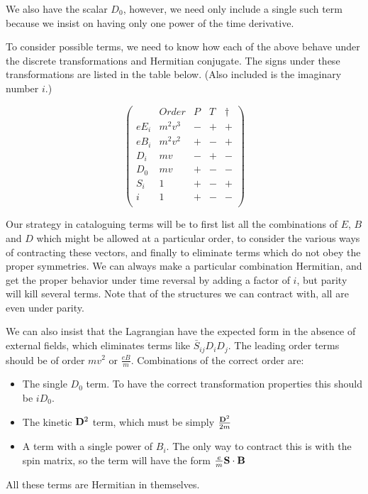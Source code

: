 We also have the scalar $D_0$, however, we need only include a single such term because we insist on having only one power of the time derivative.

To consider possible terms, we need to know how each of the above behave under the discrete transformations and Hermitian conjugate.  The signs under these transformations are listed in the table below.  (Also included is the imaginary number $i$.)

\[
\begin{pmatrix}
		& Order	&	P	&	T	&	\dagger	\\
eE_i	&m^2v^3	&	-	& 	+	&	+		\\
eB_i	&m^2v^2	&	+	&   -	&	+		\\
D_i		& mv	&	-	&	+	&	-		\\
D_0		& mv	&	+	&	-	&	-		\\
S_i		& 1		&	+	&	-	&	+		\\
i		& 1		&	+	&	-	&	-		\\
\end{pmatrix}
\]

Our strategy in cataloguing terms will be to first list all the combinations of $E$, $B$ and $D$ which might be allowed at a particular order, to consider the various ways of contracting these vectors, and finally to eliminate terms which do not obey the proper symmetries.  We can always make a particular combination Hermitian, and get the proper behavior under time reversal by adding a factor of $i$, but parity will kill several terms.  Note that of the structures we can contract with, all are even under parity.


We can also insist that the Lagrangian have the expected form in the absence of external fields, which eliminates terms like $\bar{S}_{ij}D_i D_j$.
The leading order terms should be of order $mv^2$ or $\frac{eB}{m}$.  Combinations of the correct order are:
\begin{itemize}
  \item The single $D_0$ term.  To have the correct transformation properties this should be $iD_0$.
  \item The kinetic $\mathbf{D}^2$ term, which must be simply $\frac{\mathbf{D}^2}{2m}$
  \item A term with a single power of $B_i$.  The only way to contract this is with the spin matrix, so the term will have the form $\frac{e}{m} \mathbf{S} \cdot \mathbf{B}$
\end{itemize}
All these terms are Hermitian in themselves.

